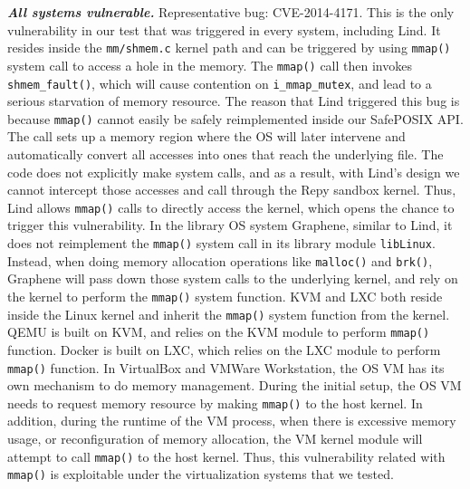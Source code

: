 {{{\emph{\textbf{All systems vulnerable.}}  Representative bug: CVE-2014-4171.
This is the only vulnerability in our test that was triggered in every
system, including Lind. It resides inside the \texttt{mm/shmem.c} kernel path and
can be triggered by using \texttt{mmap()} system call to access a hole in the memory.
The \texttt{mmap()} call then invokes \texttt{shmem\_fault()}, which will cause contention
on \texttt{i\_mmap\_mutex}, and lead to a serious starvation of memory resource.
The reason that Lind triggered this bug is because \texttt{mmap()} cannot easily
be safely reimplemented inside our SafePOSIX API. The call sets up a
memory region where the OS will later
intervene and automatically convert all accesses into ones that reach the
underlying file.  The code does not explicitly make system calls, and as
a result, with Lind's design we cannot intercept those accesses and call through
the Repy sandbox kernel. Thus,
Lind allows \texttt{mmap()} calls to directly access the kernel, which
opens the chance to trigger this vulnerability. 
In the library OS system Graphene, similar to Lind, it does not reimplement the 
\texttt{mmap()} system call in its library module \texttt{libLinux}. Instead, when doing 
memory allocation operations like \texttt{malloc()} and \texttt{brk()}, Graphene will 
pass down those system calls to the underlying kernel, and rely on the kernel to 
perform the \texttt{mmap()} system function. 
KVM and LXC both reside inside the Linux kernel and inherit the \texttt{mmap()} system function 
from the kernel. QEMU is built on KVM, and relies on the KVM module to perform \texttt{mmap()} 
function. Docker is built on LXC, which relies on the LXC module to perform \texttt{mmap()} 
function. In VirtualBox and VMWare Workstation, the OS VM has its own mechanism to 
do memory management. During the initial setup, the OS VM needs to request memory resource 
by making \texttt{mmap()} to the host kernel. In addition, during the runtime of the VM process, 
when there is excessive memory usage, or reconfiguration of memory allocation, the VM kernel module 
will attempt to call \texttt{mmap()} to the host kernel. Thus, this vulnerability related with \texttt{mmap()} 
is exploitable under the virtualization systems that we tested. 

}}}
